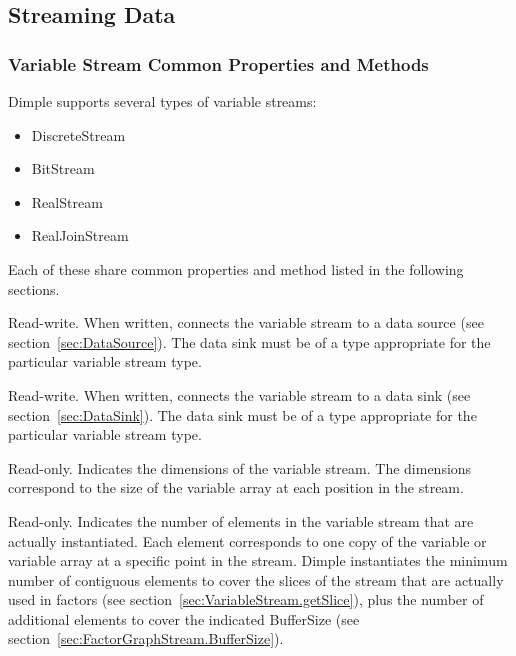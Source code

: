 \subsection{Streaming Data}

\subsubsection{Variable Stream Common Properties and Methods}

Dimple supports several types of variable streams:

\begin{itemize}
\item DiscreteStream
\item BitStream
\item RealStream
\item RealJoinStream
\end{itemize}

Each of these share common properties and method listed in the following sections.



Read-write.  When written, connects the variable stream to a data source (see section~\ref{sec:DataSource}).  The data sink must be of a type appropriate for the particular variable stream type.


Read-write.  When written, connects the variable stream to a data sink (see section~\ref{sec:DataSink}).  The data sink must be of a type appropriate for the particular variable stream type.

\ifmatlab
{}

Read-only.  Indicates the dimensions of the variable stream.  The dimensions correspond to the size of the variable array at each position in the stream.
\fi


Read-only.  Indicates the number of elements in the variable stream that are actually instantiated.  Each element corresponds to one copy of the variable or variable array at a specific point in the stream.  Dimple instantiates the minimum number of contiguous elements to cover the slices of the stream that are actually used in factors (see section~\ref{sec:VariableStream.getSlice}), plus the number of additional elements to cover the indicated BufferSize (see section~\ref{sec:FactorGraphStream.BufferSize}).

